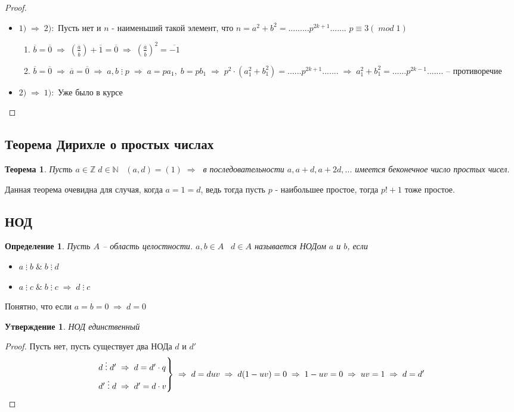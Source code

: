 \documentclass[12pt, a4paper]{article}
\newcommand{\nat}{\mathds{N}}
\newcommand{\ra}{\;\Rightarrow\;}
\newcommand{\Z}{\mathds{Z}}
\newcommand{\cl}[1]{\overline{#1}}
\newcommand{\de}{\;\vdots\;}
\theoremstyle{plain}
\newtheorem*{Th*}{Теорема}
\newtheorem{Def}{Определение}
\newtheorem*{Statement*}{Утверждение}
\theoremstyle{definition}
\begin{document}
\begin{proof}~\
    \begin{itemize}
        \item $1)\ra2):$ Пусть нет и $n$ - наименьший такой элемент, что $n = a^2+b^2 = .........p^{2k+1}.......$
        $p \equiv 3(\; mod \; 1)$
        \begin{enumerate}
            \item $\cl{b} = \cl{0}\ra \left(\frac{\cl{a}}{\cl{b}}\right)+\cl{1} = \cl{0}\ra {\left(\frac{\cl{a}}{\cl{b}}\right)}^2 = \cl{-1}$
            \item $\cl{b} = \cl{0}\ra \cl{a} = \cl{0}\ra a,b\de p\ra a = pa_1,\;b=pb_1\ra p^2\cdot(a_1^2+b_1^2) = ......p^{2k+1}.......\ra a_1^2+b_1^2 = ......p^{2k-1}.......$ -- противоречие 
        \end{enumerate}
        \item $2)\ra1):$ Уже было в курсе
    \end{itemize}
\end{proof}
\subsection*{Теорема Дирихле о простых числах}
\begin{Th*}
    Пусть $a\in\Z\; d\in \nat\;\;\; (a,d) = (1) \ra $ в последовательности $a,a+d,a+2d,...$ имеется беконечное число простых чисел. 
\end{Th*}
Данная теорема очевидна для случая, когда $a = 1 = d$, ведь тогда пусть $p$ - наибольшее простое, тогда $p!+1$ тоже простое.
\subsection*{НОД}
\begin{Def}
    Пусть $A$ -- область целостности. $a,b\in A\;\;\; d\in A$ называется НОДом $a$ и $b$, если
    \begin{itemize}
        \item $a\de b\; \&\; b\de d$
        \item $a\de c \;\&\; b\de c \ra d\de c$
    \end{itemize}
\end{Def}
Понятно, что если $a = b = 0 \ra d = 0$
\begin{Statement*}
    НОД единственный
\end{Statement*}
\begin{proof}
    Пусть нет, пусть существует два НОДа $d$ и $d'$
    \begin{equation*}
        \begin{rcases}
            d\de d'\ra d = d'\cdot q\\
            d'\de d \ra d' = d\cdot v
        \end{rcases}
        \ra d = duv\ra d(1-uv) = 0\ra 1-uv = 0\ra uv = 1\ra d = d'
    \end{equation*}
\end{proof}
\end{document}
